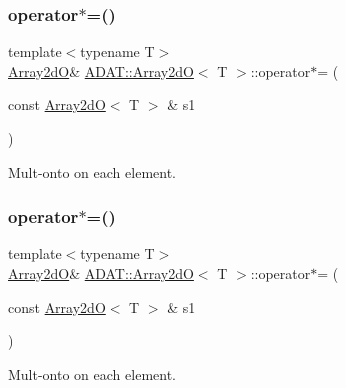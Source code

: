 \subsubsection{\texorpdfstring{operator$\ast$=()}{operator*=()}\hspace{0.1cm}{\footnotesize\ttfamily [1/6]}}
{\footnotesize\ttfamily template$<$typename T$>$ \\
\mbox{\hyperlink{classADAT_1_1Array2dO}{Array2dO}}\& \mbox{\hyperlink{classADAT_1_1Array2dO}{A\+D\+A\+T\+::\+Array2dO}}$<$ T $>$\+::operator$\ast$= (\begin{DoxyParamCaption}\item[{const \mbox{\hyperlink{classADAT_1_1Array2dO}{Array2dO}}$<$ T $>$ \&}]{s1 }\end{DoxyParamCaption})\hspace{0.3cm}{\ttfamily [inline]}}



Mult-\/onto on each element. 

\mbox{\label{classADAT_1_1Array2dO_af8304f9edc7ab12b002b6a96f02a2111}} 
\subsubsection{\texorpdfstring{operator$\ast$=()}{operator*=()}\hspace{0.1cm}{\footnotesize\ttfamily [2/6]}}
{\footnotesize\ttfamily template$<$typename T$>$ \\
\mbox{\hyperlink{classADAT_1_1Array2dO}{Array2dO}}\& \mbox{\hyperlink{classADAT_1_1Array2dO}{A\+D\+A\+T\+::\+Array2dO}}$<$ T $>$\+::operator$\ast$= (\begin{DoxyParamCaption}\item[{const \mbox{\hyperlink{classADAT_1_1Array2dO}{Array2dO}}$<$ T $>$ \&}]{s1 }\end{DoxyParamCaption})\hspace{0.3cm}{\ttfamily [inline]}}



Mult-\/onto on each element. 

\mbox{\label{classADAT_1_1Array2dO_af8304f9edc7ab12b002b6a96f02a2111}} 
